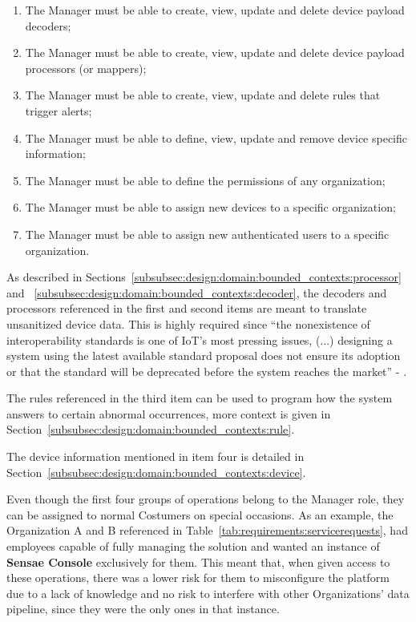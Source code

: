\begin{enumerate}
    \item The Manager must be able to create, view, update and delete device payload decoders;
    \item The Manager must be able to create, view, update and delete device payload processors (or mappers);
    \item The Manager must be able to create, view, update and delete rules that trigger alerts;
    \item The Manager must be able to define, view, update and remove device specific information;
    \item The Manager must be able to define the permissions of any organization;
    \item The Manager must be able to assign new devices to a specific organization;
    \item The Manager must be able to assign new authenticated users to a specific organization.
\end{enumerate}

As described in Sections~\ref{subsubsec:design:domain:bounded_contexts:processor} and ~\ref{subsubsec:design:domain:bounded_contexts:decoder}, the decoders and processors referenced in the first and second items are meant to translate unsanitized device data. This is highly required since ``the nonexistence of interoperability standards is one of \gls{IoT}'s most pressing issues, (...) designing a system using the latest available standard proposal does not ensure its adoption or that the standard will be deprecated before the system reaches the market'' - \cite{DIAS2022100529}.

The rules referenced in the third item can be used to program how the system answers to certain abnormal occurrences, more context is given in Section~\ref{subsubsec:design:domain:bounded_contexts:rule}.

The device information mentioned in item four is detailed in Section~\ref{subsubsec:design:domain:bounded_contexts:device}.

Even though the first four groups of operations belong to the Manager role, they can be assigned to normal Costumers on special occasions. As an example, the Organization A and B referenced in Table~\ref{tab:requirements:servicerequests}, had employees capable of fully managing the solution and wanted an instance of \textbf{Sensae Console} exclusively for them. This meant that, when given access to these operations, there was a lower risk for them to misconfigure the platform due to a lack of knowledge and no risk to interfere with other Organizations' data pipeline, since they were the only ones in that instance.

